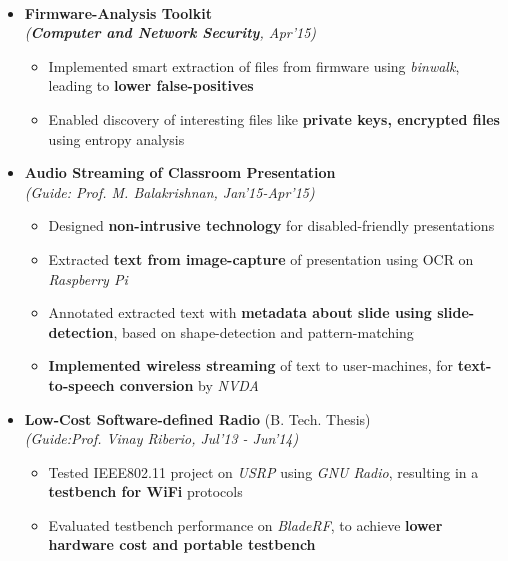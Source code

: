\\[\lsep]

\begin{itemize}
	\itemsep-0.25em
	\item \textbf{Firmware-Analysis Toolkit} \\
	\emph{(\textbf{Computer and Network Security}, Apr'15)} \\[-0.7cm]

		\begin{itemize}\itemsep \isep
		\item Implemented smart extraction of files from firmware using \textit{binwalk}, leading to \textbf{lower false-positives}
		\item Enabled discovery of interesting files like \textbf{private keys, encrypted files} using entropy analysis
		\end{itemize}

	\item \textbf{Audio Streaming of Classroom Presentation} \\
	\emph{(Guide: Prof. M. Balakrishnan, Jan'15-Apr'15)} \\[-0.7cm]

		\begin{itemize}\itemsep \isep
		\item Designed \textbf{non-intrusive technology} for disabled-friendly presentations
		\item Extracted \textbf{text from image-capture} of presentation using OCR on \textit{Raspberry Pi}
		\item Annotated extracted text with \textbf{metadata about slide using slide-detection}, based on shape-detection and pattern-matching
		\item \textbf{Implemented wireless streaming} of text to user-machines, for \textbf{text-to-speech conversion} by \textit{NVDA}
		\end{itemize}

	\item \textbf{Low-Cost Software-defined Radio} (B. Tech. Thesis) \\
	\emph{(Guide:Prof. Vinay Riberio, Jul'13 - Jun'14)} \\[-0.7cm]

		\begin{itemize}\itemsep \isep
		\item Tested IEEE802.11 project on \textit{USRP} using \textit{GNU Radio}, resulting in a \textbf{testbench for WiFi} protocols
		\item Evaluated testbench performance on \textit{BladeRF}, to achieve \textbf{lower hardware cost and portable testbench}
		\end{itemize}


\end{itemize}
